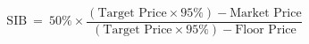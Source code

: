 \documentclass[10pt]{article}
\begin{document}
\[\text{SIB}\ =\ 50\% \times \frac{ ( \text{Target Price} \times 95\% ) - \text{Market Price}}{ ( \text{Target Price} \times 95\% ) - \text{Floor Price}}\]
\end{document}
